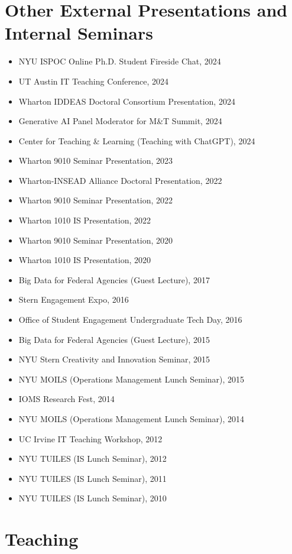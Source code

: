\documentclass[10pt,letterpaper]{article}
\begin{document}
\section*{Other External Presentations and Internal Seminars}
\begin{itemize}
\item NYU ISPOC Online Ph.D. Student Fireside Chat, 2024
\item UT Austin IT Teaching Conference, 2024
\item Wharton IDDEAS Doctoral Consortium Presentation, 2024
\item Generative AI Panel Moderator for M\&T Summit, 2024
\item Center for Teaching \& Learning (Teaching with ChatGPT), 2024
\item Wharton 9010 Seminar Presentation, 2023
\item Wharton-INSEAD Alliance Doctoral Presentation, 2022
\item Wharton 9010 Seminar Presentation, 2022
\item Wharton 1010 IS Presentation, 2022
\item Wharton 9010 Seminar Presentation, 2020
\item Wharton 1010 IS Presentation, 2020
\item Big Data for Federal Agencies (Guest Lecture), 2017
\item Stern Engagement Expo, 2016
\item Office of Student Engagement Undergraduate Tech Day, 2016
\item Big Data for Federal Agencies (Guest Lecture), 2015
\item NYU Stern Creativity and Innovation Seminar, 2015
\item NYU MOILS (Operations Management Lunch Seminar), 2015
\item IOMS Research Fest, 2014
\item NYU MOILS (Operations Management Lunch Seminar), 2014
\item UC Irvine IT Teaching Workshop, 2012
\item NYU TUILES (IS Lunch Seminar), 2012
\item NYU TUILES (IS Lunch Seminar), 2011
\item NYU TUILES (IS Lunch Seminar), 2010
\end{itemize}

\section*{Teaching}
\end{document}
